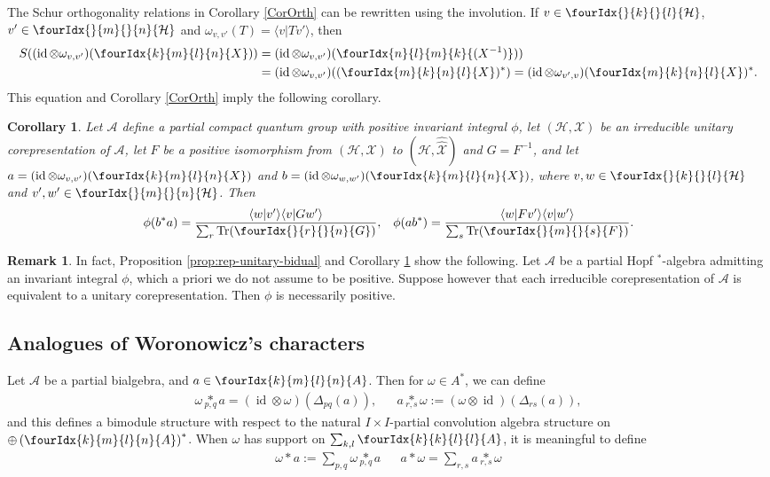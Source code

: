 \documentclass[10pt]{article}
\DeclareMathOperator{\id}{id}
\newcommand{\dualco}[1]{\hat{#1}}
\newcommand{\Hsp}{\mathcal{H}}
\newcommand{\Tr}{\mathrm{Tr}}
\newcommand{\Gr}[5]{\fourIdx{#2}{#4}{#3}{#5}{#1}}%
\newcommand{\Gru}[3]{\Gr{#1}{}{}{#2}{#3}}
\newcommand{\aste}[1]{\underset{#1}{\ast}}
\newtheorem{Cor}[Theorem]{Corollary}
\theoremstyle{definition}
\newtheorem{Rem}[Theorem]{Remark}
\numberwithin{equation}{section}
\begin{document}
The Schur orthogonality relations in Corollary \ref{CorOrth} can be
rewritten using the involution. If $v \in \Gru{\Hsp}{k}{l}$, $v' \in \Gru{\Hsp}{m}{n}$
and $\omega_{v,v'}(T) = \langle v|Tv'\rangle$, then 
\begin{align*}
  S((\id \otimes \omega_{v,v'})(\Gr{X}{k}{l}{m}{n})) &=
  (\id \otimes \omega_{v,v'}) (\Gr{(X^{-1})}{n}{m}{l}{k})) \\ & =
  (\id \otimes \omega_{v,v'})( (\Gr{X}{m}{n}{k}{l})^{*}) =
  (\id \otimes \omega_{v',v})(\Gr{X}{m}{n}{k}{l})^{*}.
\end{align*}
This equation and Corollary \ref{CorOrth} imply the following corollary.
\begin{Cor}\label{cor:rep-unitary-schur-orthogonality}
  Let $\mathscr{A}$ define a partial compact quantum group with
  positive invariant integral $\phi$, let $(\Hsp,\mathscr{X})$ be an irreducible
  unitary corepresentation of $\mathscr{A}$, let $F$ be a positive
  isomorphism from $(\Hsp,\mathscr{X})$ to
  $(\Hsp,\dualco{\dualco{\mathscr{X}}})$ and
  $G=F^{-1}$, and let $a=(\id \otimes
  \omega_{v,v'})(\Gr{X}{k}{l}{m}{n})$ and $b=(\id \otimes
  \omega_{w,w'})(\Gr{X}{k}{l}{m}{n})$, where $v,w \in
  \Gru{\Hsp}{k}{l}$ and $v',w' \in \Gru{\Hsp}{m}{n}$.  Then
\begin{align*}
  \phi(b^{*}a) &= \frac{\langle w|v'\rangle\langle v|Gw'\rangle}{\sum_{r}
    \Tr(\Gru{G}{r}{n})}, & \phi(ab^{*}) = \frac{\langle
    w|Fv'\rangle \langle v|w'\rangle}{\sum_{s}
    \Tr(\Gru{F}{m}{s})}.
\end{align*}
\end{Cor}

\begin{Rem}\label{RemPos} In fact, Proposition \ref{prop:rep-unitary-bidual} and Corollary \ref{cor:rep-unitary-schur-orthogonality} show the following. Let $\mathscr{A}$ be a partial Hopf $^*$-algebra admitting an invariant integral $\phi$, which a priori we do not assume to be positive. Suppose however that each irreducible corepresentation of $\mathscr{A}$ is equivalent to a unitary corepresentation. Then $\phi$ is necessarily positive.
\end{Rem} 

\subsection{Analogues of Woronowicz's  characters}

Let $\mathscr{A}$ be a partial bialgebra, and $a\in \Gr{A}{k}{l}{m}{n}$. Then for $\omega \in A^*$, we can define
\begin{align*} \omega \aste{p,q} a = (\id \otimes \omega) (\Delta_{pq}(a)),&&a \aste{r,s}
\omega:=(\omega \otimes \id)(\Delta_{rs}(a)),\end{align*}and this defines a bimodule structure with respect to the natural $I\times I$-partial convolution algebra structure on $\oplus \left(\Gr{A}{k}{l}{m}{n}\right)^*$. When $\omega$ has support on $\sum_{k,l}\Gr{A}{k}{l}{k}{l}$, it is meaningful to define \begin{align*} \omega\ast a := \sum_{p,q} \omega\aste{p,q}a && a\ast \omega = \sum_{r,s} a\aste{r,s}\omega \end{align*}
\end{document}
